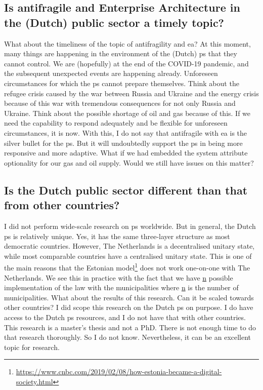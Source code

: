 \subsection{Is antifragile and Enterprise Architecture in the (Dutch) public sector a timely topic?}
\label{sub:timelytopic}
What about the timeliness of the topic of \gls{antifragility} and \acrlong{ea}? At this moment, many things are happening in the environment of the (Dutch) \gls{ps} that they cannot control. We are (hopefully) at the end of the COVID-19 pandemic, and the subsequent unexpected events are happening already. Unforeseen circumstances for which the \gls{ps} cannot prepare themselves. Think about the refugee crisis caused by the war between Russia and Ukraine and the energy crisis because of this war with tremendous consequences for not only Russia and Ukraine. Think about the possible shortage of oil and gas because of this. If we need the capability to respond adequately and be flexible for unforeseen circumstances, it is now. With this, I do not say that \gls{antifragile} with \acrlong{ea} is the silver bullet for the \gls{ps}. But it will undoubtedly support the \gls{ps} in being more responsive and more adaptive. What if we had embedded the system \gls{attribute} \gls{optionality} for our gas and oil supply. Would we still have issues on this matter?

\subsection{Is the Dutch public sector different than that from other countries?}
\label{sub:differencepublicsector}
I did not perform wide-scale research on \gls{ps} worldwide. But in general, the Dutch \gls{ps} is relatively unique. Yes, it has the same three-layer structure as most democratic countries. However, The Netherlands is a decentralised unitary state, while most comparable countries have a centralised unitary state. This is one of the main reasons that the Estonian model\footnote{\url{https://www.cnbc.com/2019/02/08/how-estonia-became-a-digital-society.html}} does not work one-on-one with The Netherlands. We see this in practice with the fact that we have \underline{n} possible implementation of the law with the municipalities where \underline{n} is the number of municipalities. What about the results of this research. Can it be scaled towards other countries? I did scope this research on the Dutch \gls{ps} on purpose. I do have access to the Dutch \gls{ps} resources, and I do not have that with other countries. This research is a master's thesis and not a PhD. There is not enough time to do that research thoroughly. So I do not know. Nevertheless, it can be an excellent topic for research.

